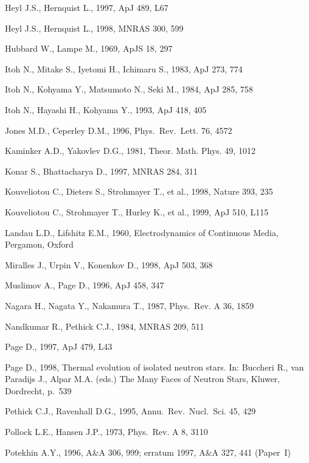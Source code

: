 \documentclass{aa}
\begin{document}
{{\begin{thebibliography}{}
Heyl J.S., Hernquist L., 1997, ApJ 489, L67

Heyl J.S., Hernquist L., 1998, MNRAS 300, 599

Hubbard W., Lampe M., 1969, ApJS 18, 297

Itoh N., Mitake S., Iyetomi H., Ichimaru S., 1983, ApJ 273, 774 
 
Itoh N., Kohyama Y., Matsumoto N., Seki M., 1984, ApJ 285, 758 
 
Itoh N., Hayashi H., Kohyama Y., 1993, ApJ 418, 405 

Jones M.D., Ceperley D.M., 1996,
Phys.\ Rev.\ Lett. 76, 4572

Kaminker A.D., Yakovlev D.G., 1981,
Theor. Math. Phys. 49, 1012

Konar S., Bhattacharya D., 1997, MNRAS 284, 311

Kouveliotou C., Dieters S., Strohmayer T., et al., 1998, 
Nature 393, 235

Kouveliotou C., Strohmayer T., Hurley K., et al., 1999, ApJ 510, L115

Landau L.D., Lifshitz E.M., 1960,
Electrodynamics of Continuous Media, Pergamon, Oxford

Miralles J., Urpin V., Konenkov D., 1998, ApJ 503, 368
 
Muslimov A., Page D., 1996, ApJ 458, 347 
 
Nagara H., Nagata Y., Nakamura T., 1987, Phys.\ Rev. A 36, 1859 
 
Nandkumar R., Pethick C.J., 1984, MNRAS 209, 511 
 
Page D., 1997, ApJ 479, L43

Page D., 1998, Thermal evolution of isolated neutron stars. 
In: Buccheri R., van Paradijs J., Alpar M.A. (eds.)
The Many Faces of Neutron Stars, 
Kluwer, Dordrecht, p.~539

Pethick C.J., Ravenhall D.G., 1995,
Annu.\ Rev.\ Nucl.\ Sci. 45, 429

Pollock L.E., Hansen J.P., 1973,
Phys.\ Rev. A 8, 3110

Potekhin A.Y., 1996, A\&A 306, 999; erratum 1997, A\&A 327, 441 (Paper~I)


\end{thebibliography}}}
\end{document}
